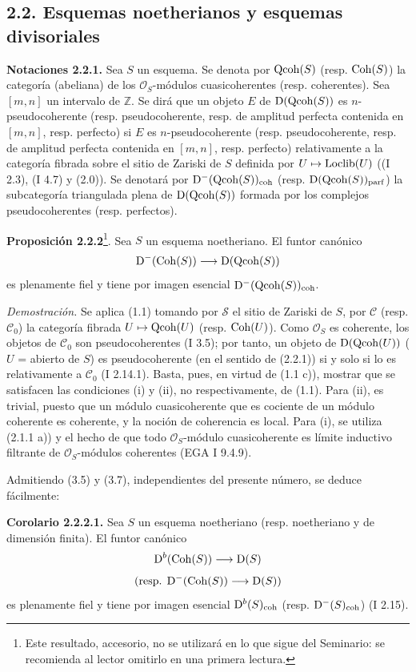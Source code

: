 \providecommand{\sisi}[2]{#2}

\subsection*{2.2. Esquemas noetherianos y esquemas divisoriales}

\textbf{Notaciones 2.2.1.} Sea $S$ un esquema. Se denota por $\operatorname{Qcoh}(S)$ (resp. $\operatorname{Coh}(S)$) la categoría (abeliana) de los $\mathcal O_S$-módulos cuasicoherentes (resp. coherentes). Sea $[m,n]$ un intervalo de $\mathbb Z$. Se dirá que un objeto $E$ de $\mathrm D(\operatorname{Qcoh}(S))$ es $n$-pseudocoherente (resp. pseudocoherente, resp. de amplitud perfecta contenida en $[m,n]$, resp. perfecto) si $E$ es $n$-pseudocoherente (resp. pseudocoherente, resp. de amplitud perfecta contenida en $[m,n]$, resp. perfecto) relativamente a la categoría fibrada sobre el sitio de Zariski de $S$ definida por $U\mapsto\operatorname{Loclib}(U)$ ((I 2.3), (I 4.7) y (2.0)). Se denotará por $\mathrm D^{-}(\operatorname{Qcoh}(S))_{\mathrm{coh}}$ (resp. $\mathrm D(\operatorname{Qcoh}(S))_{\mathrm{parf}}$) la subcategoría triangulada plena de $\mathrm D(\operatorname{Qcoh}(S))$ formada por los complejos pseudocoherentes (resp. perfectos).

\textbf{Proposición 2.2.2}\footnote{Este resultado, accesorio, no se utilizará en lo que sigue del Seminario: se recomienda al lector omitirlo en una primera lectura.}. Sea $S$ un esquema noetheriano. El funtor canónico
\[
\mathrm D^{-}(\operatorname{Coh}(S))\longrightarrow \mathrm D(\operatorname{Qcoh}(S))
\]
es plenamente fiel y tiene por imagen esencial $\mathrm D^{-}(\operatorname{Qcoh}(S))_{\mathrm{coh}}$.

\emph{Demostración.} Se aplica (1.1) tomando por $\sisi{S}{\mathcal S}$ el sitio de Zariski de $S$, por $\mathcal C$ (resp. $\mathcal C_0$) la categoría fibrada $U\mapsto\operatorname{Qcoh}(U)$ (resp. $\operatorname{Coh}(U)$). Como $\mathcal O_S$ es coherente, los objetos de $\mathcal C_0$ son pseudocoherentes (I 3.5); por tanto, un objeto de $\mathrm D(\operatorname{Qcoh}(U))$ ($U$ = abierto de $S$) es pseudocoherente (en el sentido de (2.2.1)) si y solo si lo es relativamente a $\mathcal C_0$ (I 2.14.1). Basta, pues, en virtud de (1.1 c)), mostrar que se satisfacen las condiciones (i) y (ii), no respectivamente, de (1.1). Para (ii), es trivial, puesto que un módulo cuasicoherente que es cociente de un módulo coherente es coherente, y la noción de coherencia es local. Para (i), se utiliza (2.1.1 a)) y el hecho de que todo $\mathcal O_S$-módulo cuasicoherente es límite inductivo filtrante de $\mathcal O_S$-módulos coherentes (EGA I 9.4.9).

Admitiendo (3.5) y (3.7), independientes del presente número, se deduce fácilmente:

\textbf{Corolario 2.2.2.1.} Sea $S$ un esquema noetheriano (resp. noetheriano y de dimensión finita). El funtor canónico
\[
\mathrm D^b(\operatorname{Coh}(S))\longrightarrow\mathrm D(S)
\]
\[
(\text{resp. }\mathrm D^{-}(\operatorname{Coh}(S))\longrightarrow\mathrm D(S))
\]
es plenamente fiel y tiene por imagen esencial $\mathrm D^b(S)_{\mathrm{coh}}$ (resp. $\mathrm D^{-}(S)_{\mathrm{coh}}$) (I 2.15).
